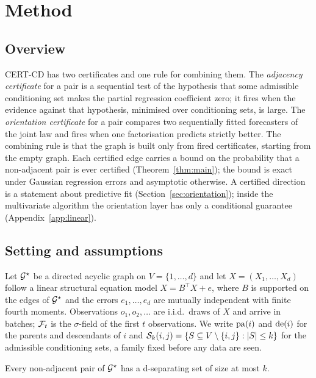 
\section{Method}\label{sec:method}

\subsection{Overview}\label{sec:overview}

CERT-CD has two certificates and one rule for combining them. The
\emph{adjacency certificate} for a pair is a sequential test of the hypothesis
that some admissible conditioning set makes the partial regression coefficient
zero; it fires when the evidence against that hypothesis, minimised over
conditioning sets, is large. The \emph{orientation certificate} for a pair
compares two sequentially fitted forecasters of the joint law and fires when one
factorisation predicts strictly better. The combining rule is that the graph is
built only from fired certificates, starting from the empty graph. Each certified
edge carries a bound on the probability that a non-adjacent pair is ever
certified (Theorem~\ref{thm:main}); the bound is exact under Gaussian regression
errors and asymptotic otherwise. A certified direction is a statement about
predictive fit (Section~\ref{sec:orientation}); inside the multivariate algorithm the
orientation layer has only a conditional guarantee (Appendix~\ref{app:linear}).



\subsection{Setting and assumptions}\label{sec:setting}

Let $\mathcal{G}^{\star}$ be a directed acyclic graph on $V=\{1,\dots,d\}$ and let
$X=(X_1,\dots,X_d)$ follow a linear structural equation model
$X = B^\top X + e$, where $B$ is supported on the edges of $\mathcal{G}^{\star}$ and the
errors $e_1,\dots,e_d$ are mutually independent with finite fourth moments.
Observations $o_1,o_2,\dots$ are i.i.d.\ draws of $X$ and arrive in batches;
$\mathcal{F}_t$ is the $\sigma$-field of the first $t$ observations. We write
$\mathrm{pa}(i)$ and $\mathrm{de}(i)$ for the parents and descendants of $i$ and
$\mathcal{S}_k(i,j)=\{S\subseteq V\setminus\{i,j\}: |S|\le k\}$ for the admissible
conditioning sets, a family fixed before any data are seen.

\begin{assumption}\label{ass:sep}
Every non-adjacent pair of $\mathcal{G}^{\star}$ has a d-separating set of size at most $k$.
\end{assumption}

